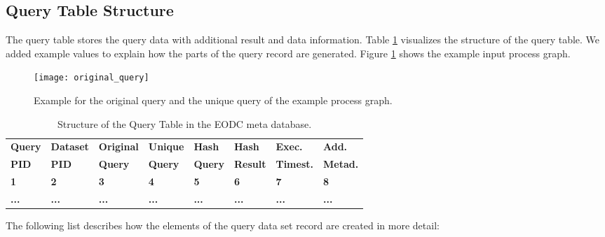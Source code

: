 \documentclass[draft,final]{vutinfth} %
\begin{document}
\subsection{Query Table Structure}

The query table stores the query data with additional result and data information. Table \ref{Tab:querytable} visualizes the structure of the query table. We added example values to explain how the parts of the query record are generated. Figure \ref{fig:processgraph_example} shows the example input process graph.   

\begin{figure}[h]
	\centering
	\texttt{[image: original\_query]}
	\caption{Example for the original query and the unique query of the example process graph.}
	\label{fig:processgraph_example} %
\end{figure} 

\begin{table}[]
	\caption{Structure of the Query Table in the EODC meta database.}
	\begin{tabular}{|l|l|l|l|l|l|l|l|}
	\hline	\textbf{Query} & \textbf{Dataset} & \textbf{Original} & \textbf{Unique} & \textbf{Hash} & \textbf{Hash} &
		\textbf{Exec.} & \textbf{Add.}  \\ 
		\textbf{PID} & \textbf{PID} & \textbf{Query} & \textbf{Query} & \textbf{Query} & \textbf{Result} &
		\textbf{Timest.} & \textbf{Metad.}  \\ \hline
		\textbf{1} & \textbf{2} & \textbf{3} & \textbf{4} & \textbf{5} & \textbf{6} &
		\textbf{7} & \textbf{8} \\ \hline
		\textbf{...} & \textbf{...} & \textbf{...} & \textbf{...} & \textbf{...} & \textbf{...} & \textbf{...} & \textbf{...} \\ \hline
	\end{tabular}
	\label{Tab:querytable}
\end{table}

The following list describes how the elements of the query data set record are created in more detail:
\end{document}
